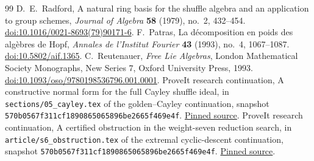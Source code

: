 \documentclass[11pt,a4paper]{article}
\numberwithin{equation}{section}
\theoremstyle{definition}
\theoremstyle{remark}
\begin{document}
\begin{thebibliography}{99}
D.~E.~Radford, A natural ring basis for the shuffle algebra and an
application to group schemes, \emph{Journal of Algebra} \textbf{58}
(1979), no.~2, 432--454.
\href{https://doi.org/10.1016/0021-8693(79)90171-6}{doi:10.1016/0021-8693(79)90171-6}.
F.~Patras, La d\'ecomposition en poids des alg\`ebres de Hopf,
\emph{Annales de l'Institut Fourier} \textbf{43} (1993), no.~4,
1067--1087. \href{https://doi.org/10.5802/aif.1365}{doi:10.5802/aif.1365}.
C.~Reutenauer, \emph{Free Lie Algebras}, London Mathematical Society
Monographs, New Series 7, Oxford University Press, 1993.
\href{https://doi.org/10.1093/oso/9780198536796.001.0001}{doi:10.1093/oso/9780198536796.001.0001}.
ProveIt research continuation, A constructive normal form for the full
Cayley shuffle ideal, in
\texttt{sections/05\_cayley.tex} of the golden--Cayley continuation,
snapshot \texttt{570b0567f311cf1890865065896be2665f469e4f}.
\href{https://github.com/VladimirReshetnikov/ProveIt/blob/570b0567f311cf1890865065896be2665f469e4f/Analysis/Polylogarithms/docs/reports/fractional-cayley-scaling/continuations/golden-cayley-double-turning/sections/05_cayley.tex}{Pinned source}.
ProveIt research continuation, A certified obstruction in the weight-seven
reduction search, in
\texttt{article/s6\_obstruction.tex} of the extremal cyclic-descent continuation,
snapshot \texttt{570b0567f311cf1890865065896be2665f469e4f}.
\href{https://github.com/VladimirReshetnikov/ProveIt/blob/570b0567f311cf1890865065896be2665f469e4f/Analysis/Polylogarithms/docs/reports/formal-reductions-continuation/continuations/extremal-cyclic-descent/article/s6_obstruction.tex}{Pinned source}.


\end{thebibliography}

\end{document}
